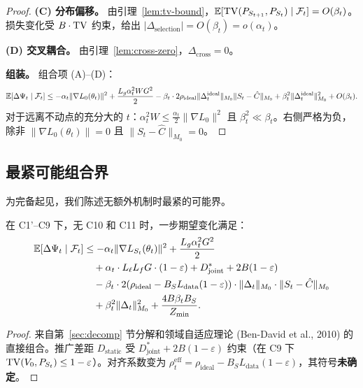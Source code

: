\begin{proof}
\textbf{(C) 分布偏移。} 由引理~\ref{lem:tv-bound}，$\mathbb{E}[\operatorname{TV}(P_{S_{t+1}}, P_{S_t}) \mid \mathcal{F}_t] = O(\beta_t)$。损失变化受 $B \cdot \operatorname{TV}$ 约束，给出 $|\Delta_{\text{selection}}| = O(\beta_t) = o(\alpha_t)$。

\textbf{(D) 交叉耦合。} 由引理~\ref{lem:cross-zero}，$\Delta_{\text{cross}} = 0$。

\textbf{组装。} 组合项 (A)--(D)：
\begin{equation}
    \mathbb{E}[\Delta\Psi_t \mid \mathcal{F}_t] \leq -\alpha_t \|\nabla L_0(\theta_t)\|^2 + \frac{L_g \alpha_t^2 W G^2}{2} - \beta_t \cdot 2\rho_{\text{ideal}} \|\Delta_t^{\text{ideal}}\|_{M_0} \|S_t - \hat{C}\|_{M_0} + \beta_t^2 \|\Delta_t^{\text{ideal}}\|_{M_0}^2 + O(\beta_t).
\end{equation}
对于远离不动点的充分大的 $t$：$\alpha_t^2 W \leq \frac{\alpha_t}{2}\|\nabla L_0\|^2$ 且 $\beta_t^2 \ll \beta_t$。右侧严格为负，除非 $\|\nabla L_0(\theta_t)\| = 0$ 且 $\|S_t - \hat{C}\|_{M_0} = 0$。
\end{proof}

\subsection{最紧可能组合界}\label{sec:tightest}

为完备起见，我们陈述无额外机制时最紧的可能界。

\begin{lemma}\label{lem:tightest}
在 C1'--C9 下，无 C10 和 C11 时，一步期望变化满足：
\begin{align}
    \mathbb{E}[\Delta\Psi_t \mid \mathcal{F}_t] &\leq -\alpha_t \|\nabla L_{S_t}(\theta_t)\|^2 + \frac{L_g \alpha_t^2 G^2}{2} \notag\\
    &\quad + \alpha_t \cdot L_\ell L_f G \cdot (1 - \varepsilon) + D_{\text{joint}}^* + 2B(1-\varepsilon) \notag\\
    &\quad - \beta_t \cdot 2(\rho_{\text{ideal}} - B_S L_{\text{data}}(1-\varepsilon)) \cdot \|\Delta_t\|_{M_0} \cdot \|S_t - \hat{C}\|_{M_0} \notag\\
    &\quad + \beta_t^2 \|\Delta_t\|_{M_0}^2 + \frac{4B \beta_t B_S}{Z_{\min}}.
\end{align}
\end{lemma}

\begin{proof}
来自第~\ref{sec:decomp} 节分解和领域自适应理论 (Ben-David et al., 2010) 的直接组合。推广差距 $D_{\text{static}}$ 受 $D_{\text{joint}}^* + 2B(1-\varepsilon)$ 约束（在 C9 下 $\operatorname{TV}(V_0, P_{S_t}) \leq 1 - \varepsilon$）。对齐系数变为 $\rho_t^{\text{eff}} = \rho_{\text{ideal}} - B_S L_{\text{data}}(1-\varepsilon)$，其符号\textbf{未确定}。
\end{proof}

